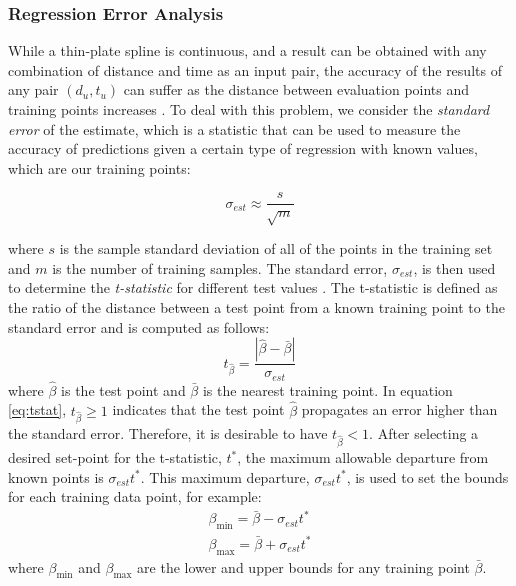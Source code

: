 \documentclass[letterpaper, 10 pt, conference]{ieeeconf}  %
\newcommand\NB[1]{$\spadesuit$\footnote{NB: #1}}
\begin{document}
\subsubsection{Regression Error Analysis} \label{sec:regerror}
While a thin-plate spline is continuous, and a result can be obtained with any combination of distance and time as an input pair, the accuracy of the results of any pair $(d_u,t_u)$ can suffer as the distance between evaluation points and training points increases \cite{regress}. To deal with this problem, we consider the {\em standard error} of the estimate, which is a statistic that can be used to measure the accuracy of predictions given a certain type of regression \cite{stdereg} with known values, which are our training points:

\begin{equation} \label{eq:stderr}
    \sigma_{est} \approx \frac{s}{\sqrt{m}}
\end{equation}

where $s$ is the sample standard deviation of all of the points in the training set and $m$ is the number of training samples. The standard error, $\sigma_{est}$, is then used to determine the {\em t-statistic} for different test values \cite{tstat}. The t-statistic is defined as the ratio of the distance between a test point from a known training point to the standard error and is computed as follows:
\begin{equation} \label{eq:tstat}
t_{\hat{\beta}} = \frac{|\hat{\beta}-\bar{\beta}|}{\sigma_{est}}    
\end{equation}
where $\hat{\beta}$ is the test point and $\bar{\beta}$ is the nearest training point. In equation \eqref{eq:tstat}, $t_{\hat{\beta}} \geq 1$ indicates that the test point $\hat{\beta}$ propagates an error higher than the standard error. Therefore, it is desirable to have $t_{\hat{\beta}} < 1$. 
After selecting a desired set-point for the t-statistic, $t^*$, the maximum allowable departure from known points is $\sigma_{est}t^*$.
This maximum departure, $\sigma_{est}t^*$, is used to set the bounds for each training data point, for example:
\vspace{-5pt}
\begin{align}
    \beta_{\min} = \bar{\beta} - \sigma_{est}t^* \nonumber \\
    \beta_{\max} = \bar{\beta} + \sigma_{est}t^*
\end{align}
where $\beta_{\min}$ and $\beta_{\max}$ are the lower and upper bounds for any training point $\bar{\beta}$. %
\end{document}
